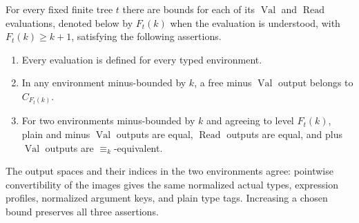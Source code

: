 \begin{lemma}\label{obs:bound-statement}
For every fixed finite tree $t$ there are bounds for each of its
$\operatorname{Val}$ and $\operatorname{Read}$ evaluations, denoted below
by $F_t(k)$ when the evaluation is understood, with
$F_t(k)\geq k+1$, satisfying the following assertions.
\begin{enumerate}
\item Every evaluation is defined for every typed environment.
\item In any environment minus-bounded by $k$, a free minus
$\operatorname{Val}$ output belongs to $C_{F_t(k)}$.
\item For two environments minus-bounded by $k$ and agreeing to level
$F_t(k)$, plain and minus $\operatorname{Val}$ outputs are equal,
$\operatorname{Read}$ outputs are equal, and plus
$\operatorname{Val}$ outputs are $\equiv_k$-equivalent.
\end{enumerate}
The output spaces and their indices in the two environments agree:
pointwise convertibility of the images gives the same normalized actual
types, expression profiles, normalized argument keys, and plain type
tags.  Increasing a chosen bound preserves all three assertions.
\end{lemma}
